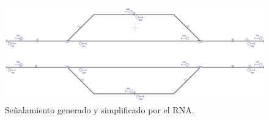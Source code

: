     \begin{figure}[h]
        \centering
        \includegraphics[width=1\textwidth]{resultados-obtenidos/ejemplo5/images/5_RNA.png}
        \centering\caption{Señalamiento generado y simplificado por el RNA.}
    \end{figure}
    
    
    
    
    